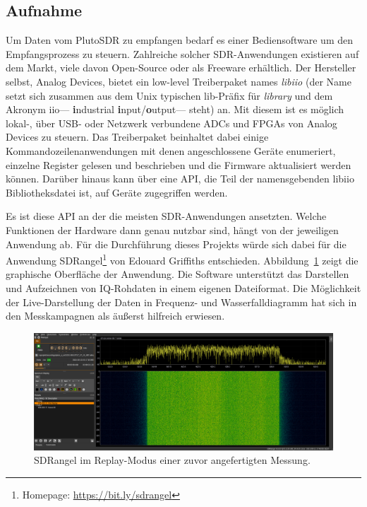 \subsection{Aufnahme}

Um Daten vom PlutoSDR zu empfangen bedarf es einer Bediensoftware um den Empfangsprozess zu steuern. Zahlreiche solcher SDR-Anwendungen existieren auf dem Markt, viele davon Open-Source oder als Freeware erhältlich. Der Hersteller selbst, Analog Devices, bietet ein low-level Treiberpaket names \emph{libiio} (der Name setzt sich zusammen aus dem Unix typischen lib-Präfix für \emph{library} und dem Akronym iio---%
\textbf{i}ndustrial \textbf{i}nput/\textbf{o}utput---%
steht) an. Mit diesem ist es möglich lokal-, über USB- oder Netzwerk verbundene ADCs und FPGAs von Analog Devices zu steuern. Das Treiberpaket beinhaltet dabei einige Kommandozeilenanwendungen mit denen angeschlossene Geräte enumeriert, einzelne Register gelesen und beschrieben und die Firmware ak­tu­a­li­sie­rt werden können. Darüber hinaus kann über eine API, die Teil der namensgebenden libiio Bibliotheksdatei ist, auf Geräte zugegriffen werden.

Es ist diese API an der die meisten SDR-Anwendungen ansetzten. Welche Funktionen der Hardware dann genau nutzbar sind, hängt von der jeweiligen Anwendung ab. Für die Durchführung dieses Projekts würde sich dabei für die Anwendung SDRangel\footnote{Homepage: \url{https://bit.ly/sdrangel}} von Edouard Griffiths entschieden. Abbildung~\ref{fig:sdrangel_screenshot} zeigt die graphische Oberfläche der Anwendung. Die Software unterstützt das Darstellen und Aufzeichnen von IQ-Rohdaten in einem eigenen Dateiformat. Die Möglichkeit der Live-Darstellung der Daten in Frequenz- und Wasserfalldiagramm hat sich in den Messkampagnen als äußerst hilfreich erwiesen.

\begin{figure}[htb]
    \centering
    \includegraphics[width=\textwidth]{images/sdrangel.png}
    \caption{SDRangel im Replay-Modus einer zuvor angefertigten Messung.}\label{fig:sdrangel_screenshot}
\end{figure}

